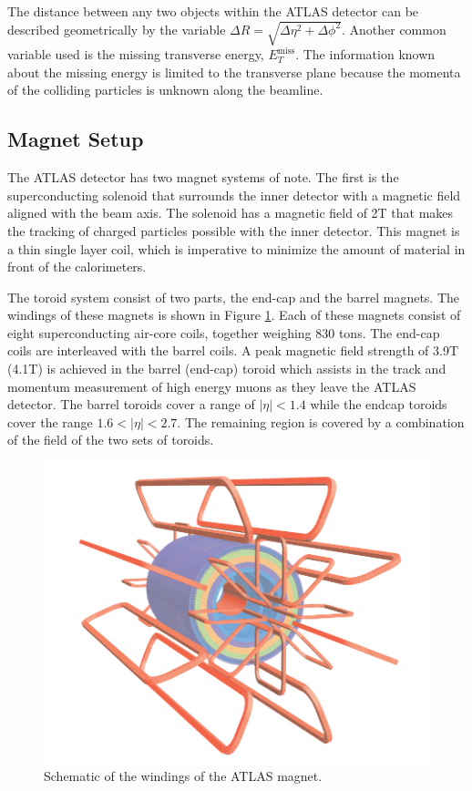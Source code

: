 The distance between any two objects within the ATLAS detector can be described geometrically by the variable $\Delta R = \sqrt{\Delta \eta^2 + \Delta \phi^2}$.  Another common variable used is the missing transverse energy, $E^{\text{miss}}_T$.  The information known about the missing energy is limited to the transverse plane because the momenta of the colliding particles is unknown along the beamline. 




\subsection{Magnet Setup}
\label{sec:ATLASMagnet}

The ATLAS detector has two magnet systems of note.  The first is the superconducting solenoid that surrounds the inner detector with a magnetic field aligned with the beam axis.  The solenoid has a magnetic field of 2T that makes the tracking of charged particles possible with the inner detector.  This magnet is a thin single layer coil, which is imperative to minimize the amount of material in front of the calorimeters. 

The toroid system consist of two parts, the end-cap and the barrel magnets.  The windings of these magnets is shown in Figure \ref{fig:ATLASMagnetWinding}.  Each of these magnets consist of eight superconducting air-core coils, together weighing 830 tons.  The end-cap coils are interleaved with the barrel coils.  A peak magnetic field strength of 3.9T (4.1T) is achieved in the barrel (end-cap) toroid which assists in the track and momentum measurement of high energy muons as they leave the ATLAS detector.  The barrel toroids cover a range of $|\eta|<1.4$ while the endcap toroids cover the range $1.6 < |\eta| <2.7$.  The remaining region is covered by a combination of the field of the two sets of toroids.
\begin{figure}[ht!]
	\centering
	\includegraphics[width=0.7\columnwidth]{../ThesisImages/LHCImages/ATLASMagnetWinding.png}
	\caption[Schematic of the windings of the ATLAS magnet.]{Schematic of the windings of the ATLAS magnet\cite{ATLAS}.
	}
	\label{fig:ATLASMagnetWinding}
\end{figure}

